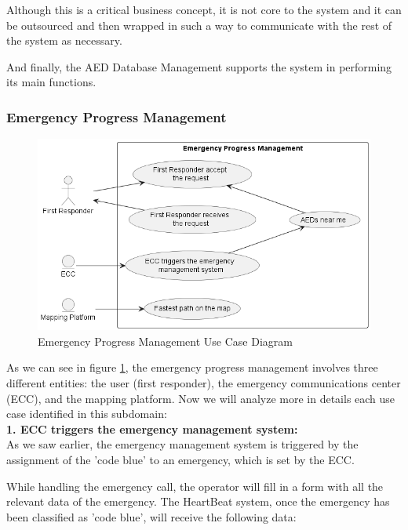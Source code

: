 \documentclass[11pt,a4paper]{article}
\begin{document}
Although this is a critical business concept, it is not core to the system and it can be outsourced and then wrapped in such a way to communicate with the rest of the system as necessary.

And finally, the AED Database Management supports the system in performing its main functions.

\subsubsection{Emergency Progress Management}

\begin{figure}
    \centering
    \includegraphics[scale=0.6, width=\textwidth]{images/uml-emergency.png}
    \caption{Emergency Progress Management Use Case Diagram}
    \label{fig:uml-emergency}
\end{figure}

As we can see in figure \ref{fig:uml-emergency}, the emergency progress management involves three different entities: the user (first responder), the emergency communications center (ECC), and the mapping platform.
%
Now we will analyze more in details each use case identified in this subdomain: \\

\textbf{1. ECC triggers the emergency management system:} \\

As we saw earlier, the emergency management system is triggered by the assignment of the 'code blue' to an emergency, which is set by the ECC.

While handling the emergency call, the operator will fill in a form with all the relevant data of the emergency.
%
The HeartBeat system, once the emergency has been classified as 'code blue', will receive the following data:
\end{document}
